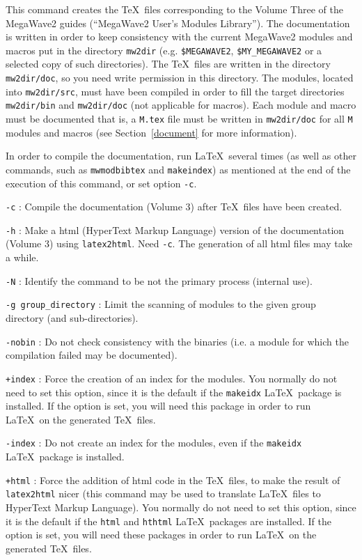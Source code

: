 \Description
This command creates the \TeX\ files corresponding to the Volume Three of the MegaWave2 guides 
(``MegaWave2 User's Modules Library'').
The documentation is written in order to keep consistency with the current
MegaWave2 modules and macros put in the directory \verb+mw2dir+ 
(e.g. \verb+$MEGAWAVE2+, \verb+$MY_MEGAWAVE2+ or a selected copy of such 
directories).
The \TeX\ files are written in the directory \verb+mw2dir/doc+, so you need
write permission in this directory.
The modules, located into \verb+mw2dir/src+, must have been compiled in order
to fill the target directories \verb+mw2dir/bin+ and \verb+mw2dir/doc+
(not applicable for macros).
Each module and macro must be documented that is, a \verb+M.tex+ file must 
be written in \verb+mw2dir/doc+ for all \verb+M+ modules and macros
(see Section~\ref{document} for more information).

In order to compile the documentation, run \LaTeX\ several times (as well as
other commands, such as {\tt mwmodbibtex} and {\tt makeindex}) as mentioned at the end
of the execution of this command, or set option {\tt -c}.

\Next

\Options

\verb+-c+ : Compile the documentation (Volume 3) after \TeX\ files have been created.

\verb+-h+ : Make a html (HyperText Markup Language) version of the documentation (Volume 3) using {\tt latex2html}. Need {\tt -c}. The generation of all html files may take a while.

\verb+-N+ : Identify the command to be not the primary process (internal use). 

\verb+-g group_directory+ : Limit the scanning of modules to the given group directory (and sub-directories).

\verb+-nobin+ : Do not check consistency with the binaries (i.e. a module for which the compilation failed may be documented).

\verb=+index= : Force the creation of an index for the modules. You normally do not need to set this option,
since it is the default if the \verb+makeidx+ \LaTeX\ package is installed.
If the option is set, you will need this package in order to run \LaTeX\ on the generated \TeX\ files.

\verb=-index= : Do not create an index for the modules, even if the \verb+makeidx+ \LaTeX\ package is 
installed.

\verb=+html= : Force the addition of html code in the \TeX\ files, to make the result of \verb+latex2html+
nicer (this command may be used to translate \LaTeX\ files to HyperText Markup Language). 
You normally do not need to set this option, since it is the default if the \verb+html+ and
\verb+hthtml+ \LaTeX\ packages are installed.
If the option is set, you will need these packages in order to run \LaTeX\ on the generated \TeX\ files.

